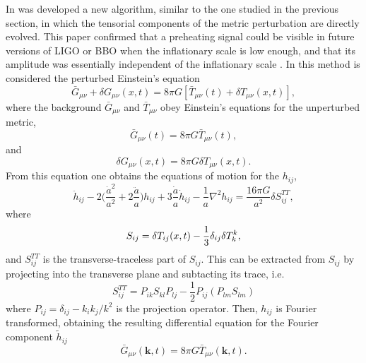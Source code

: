 \documentclass[11pt,a4paper,twoside]{book}
\begin{document}
In \cite{Chap7:SpectralMethod} was developed a new algorithm, similar to the one studied in the previous section, in which  the tensorial components of the metric perturbation are directly evolved. This paper confirmed that a preheating signal could be visible in future versions of LIGO or BBO when the inflationary scale is low enough, and that its amplitude was essentially independent of the inflationary scale \cite{Chap7:SpectralMethodComparison}. In this method is considered the perturbed Einstein's equation
\begin{equation}
\label{chap7:PertubedEinsteinEquation}
\bar{G}_{\mu\nu} + \delta G_{\mu\nu}(x,t) = 8\pi G [\bar{T}_{\mu\nu}(t) + \delta T_{\mu\nu}(x,t)],
\end{equation}
where the background $\bar{G}_{\mu\nu}$ and $ \bar{T}_{\mu\nu} $ obey Einstein's equations for the unperturbed  metric,
\begin{equation}
\label{Chap7:BackgroundMetic}
\bar{G}_{\mu\nu}(t)= 8\pi G \bar{T}_{\mu\nu}(t),
\end{equation}
and 
\begin{equation}
\label{Chap7:PerturbedEquation}
\delta G_{\mu\nu}(x,t)=8\pi G \delta T_{\mu\nu}(x,t).
\end{equation}
From this equation one obtains the equations of motion for the $ h_{ij} $,
\begin{equation}
	\label{Chap7:EquationGWs}
	\ddot{h}_{ij}-2\Bigg(\frac{\dot{a}^{2}}{a^{2}} + 2\frac{\ddot{a}}{a}\Bigg)h_{ij} + 3\frac{\dot{a}}{a}\dot{h}_{ij}-\frac{1}{a}\nabla^{2}h_{ij} = \frac{16\pi G}{a^{2}} \delta S^{TT}_{ij},
\end{equation}
where 
\begin{equation}
	\label{Chap7:S_{ij}}
	S_{ij}=\delta T_{ij}(x,t) - \frac{1}{3}\delta_{ij}\delta T^{k}_{k},
\end{equation}
and $ S^{TT}_{ij} $ is the transverse-traceless part of $ S_{ij} $. This can be extracted from $ S_{ij} $ by projecting into the transverse plane and subtacting its trace, i.e.
\begin{equation}
\label{Chap7:transverseTracelessPartS}
S_{ij}^{TT}=P_{ik}S_{kl}P_{lj} - \frac{1}{2}P_{ij}(P_{lm}S_{lm})
\end{equation}
where $ P_{ij}=\delta_{ij}- k_{i}k_{j}/k^{2} $ is the projection operator. Then, $ h_{ij} $ is Fourier transformed, obtaining the resulting differential equation for the Fourier component $\tilde{h}_{ij}$
\begin{equation}
\label{Chap7:SpectralEquation}
\bar{G}_{\mu\nu}(\textbf{k},t) = 8\pi G \bar{T}_{\mu\nu}(\textbf{k},t).
\end{equation}
\end{document}
